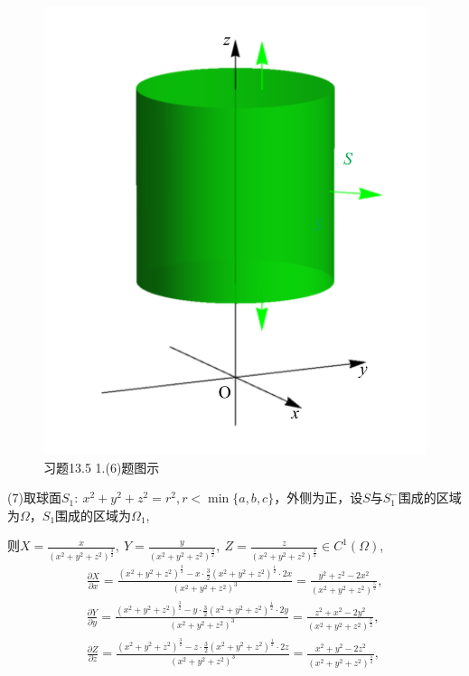 \documentclass[12pt,UTF8,fleqn]{ctexart}
\newcommand{\pp}[2]{\frac{\partial #1}{\partial #2}}
\begin{document}
\begin{enumerate}
\begin{figure}[H]
\begin{center}
\includegraphics[height=0.5\textheight]{Figures24/Fig13-5-1-6.pdf}
\end{center}
\caption{习题13.5 1.(6)题图示}
\label{13-5-1-6}
\end{figure}

(7)取球面$S_1:\ x^2+y^2+z^2=r^2,r<\min\{a,b,c\}$，外侧为正，设$S$与$S_1^-$围成的区域为$\Omega$，$S_1$围成的区域为$\Omega_1$,

则$X=\frac x{(x^2+y^2+z^2)^{\frac32}},\ Y=\frac y{(x^2+y^2+z^2)^{\frac32}},\ Z=\frac z{(x^2+y^2+z^2)^{\frac32}}\in C^1(\Omega)$,
\[\begin{aligned}
\pp Xx=\frac{(x^2+y^2+z^2)^{\frac32}-x\cdot\frac32(x^2+y^2+z^2)^{\frac12}\cdot2x}{(x^2+y^2+z^2)^3}=\frac{y^2+z^2-2x^2}{(x^2+y^2+z^2)^{\frac52}},\\
\pp Yy=\frac{(x^2+y^2+z^2)^{\frac32}-y\cdot\frac32(x^2+y^2+z^2)^{\frac12}\cdot2y}{(x^2+y^2+z^2)^3}=\frac{z^2+x^2-2y^2}{(x^2+y^2+z^2)^{\frac52}},\\
\pp Zz=\frac{(x^2+y^2+z^2)^{\frac32}-z\cdot\frac32(x^2+y^2+z^2)^{\frac12}\cdot2z}{(x^2+y^2+z^2)^3}=\frac{x^2+y^2-2z^2}{(x^2+y^2+z^2)^{\frac52}},
\end{aligned}\]


\end{enumerate}
\end{document}
